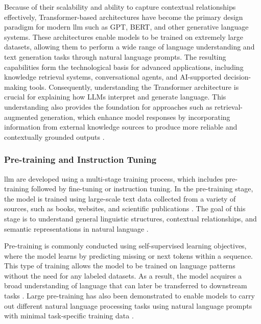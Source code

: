 Because of their scalability and ability to capture contextual relationships effectively, Transformer-based architectures have become the primary design paradigm for modern \gls{llm} such as GPT, BERT, and other generative language systems. These architectures enable models to be trained on extremely large datasets, allowing them to perform a wide range of language understanding and text generation tasks through natural language prompts. The resulting capabilities form the technological basis for advanced applications, including knowledge retrieval systems, conversational agents, and AI-supported decision-making tools. Consequently, understanding the Transformer architecture is crucial for explaining how LLMs interpret and generate language. This understanding also provides the foundation for approaches such as retrieval-augmented generation, which enhance model responses by incorporating information from external knowledge sources to produce more reliable and contextually grounded outputs \cite{vaswani2017attention}.

\subsubsection{Pre-training and Instruction Tuning \label{sec:Pre-training and Instruction Tuning}}
\gls{llm} are developed using a multi-stage training process, which includes pre-training followed by fine-tuning or instruction tuning. In the pre-training stage, the model is trained using large-scale text data collected from a variety of sources, such as books, websites, and scientific publications \cite{devlin2019bertpretrainingdeepbidirectional}.
The goal of this stage is to understand general linguistic structures, contextual relationships, and semantic representations in natural language \cite{devlin2019bertpretrainingdeepbidirectional}.

Pre-training is commonly conducted using self-supervised learning objectives, where the model learns by predicting missing or next tokens within a sequence. This type of training allows the model to be trained on language patterns without the need for any labeled datasets. As a result, the model acquires a broad understanding of language that can later be transferred to downstream tasks \cite{devlin2019bertpretrainingdeepbidirectional}. Large pre-training has also been demonstrated to enable models to carry out different natural language processing tasks using natural language prompts with minimal task-specific training data \cite{brown2020languagemodelsfewshotlearners}.

